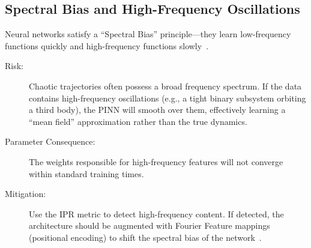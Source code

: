 \subsection{Spectral Bias and High-Frequency Oscillations}

Neural networks satisfy a ``Spectral Bias'' principle—they learn low-frequency functions quickly and high-frequency functions slowly~\cite{ref8}.
\begin{description}
    \item[Risk:] Chaotic trajectories often possess a broad frequency spectrum. If the data contains high-frequency oscillations (e.g., a tight binary subsystem orbiting a third body), the PINN will smooth over them, effectively learning a ``mean field'' approximation rather than the true dynamics.
    \item[Parameter Consequence:] The weights responsible for high-frequency features will not converge within standard training times.
    \item[Mitigation:] Use the IPR metric to detect high-frequency content. If detected, the architecture should be augmented with Fourier Feature mappings (positional encoding) to shift the spectral bias of the network~\cite{ref8}.
\end{description}